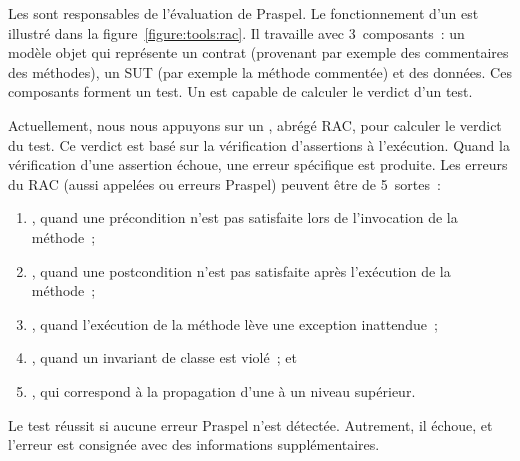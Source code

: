 Les  sont responsables de l'évaluation de Praspel.
Le fonctionnement d'un  est illustré dans la
figure~\ref{figure:tools:rac}. Il travaille avec 3~composants~: un modèle objet
 qui représente un contrat (provenant par exemple des commentaires
des méthodes), un SUT  (par exemple la méthode commentée) et des
données. Ces composants forment un test. Un  est
capable de calculer le verdict d'un test.

Actuellement, nous nous appuyons sur un ,
abrégé RAC, pour calculer le verdict du test. Ce verdict est basé sur la
vérification d'assertions à l'exécution. Quand la vérification d'une assertion
échoue, une erreur spécifique est produite. Les erreurs du RAC (aussi appelées
 ou erreurs Praspel) peuvent être de 5~sortes~:
%
\begin{enumerate}

\item {}, quand une précondition n'est pas
satisfaite lors de l'invocation de la méthode~;

\item {}, quand une postcondition n'est pas
satisfaite après l'exécution de la méthode~;

\item {}, quand l'exécution de la méthode lève une
exception inattendue~;

\item {}, quand un invariant de classe est violé~; et

\item {}, qui correspond à la propagation
d'une  à un niveau supérieur.

\end{enumerate}
%
Le test réussit si aucune erreur Praspel n'est détectée. Autrement, il échoue,
et l'erreur est consignée avec des informations supplémentaires.

